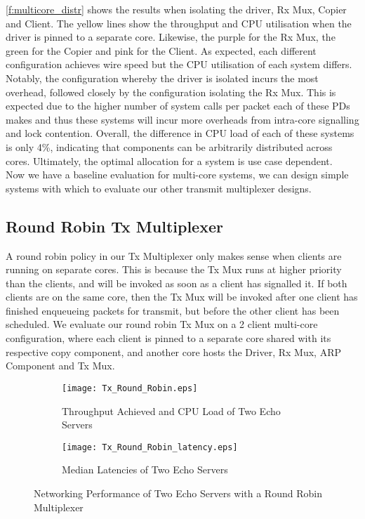 \autoref{f:multicore_distr} shows the results when isolating the driver, Rx Mux, Copier and Client. The yellow lines show the throughput
and CPU utilisation when the driver is pinned to a separate core. Likewise, the purple for the Rx Mux, the green for the Copier and pink for
the Client. As expected, each different configuration achieves wire speed but the CPU utilisation of each system differs. Notably, 
the configuration whereby the driver is isolated incurs the most overhead, followed closely by the configuration isolating the Rx Mux. This is 
expected due to the higher number of system calls per packet each of these PDs makes and thus these systems will incur more overheads from
intra-core signalling and lock contention. Overall, the difference in CPU load of each of these systems is only 4\%, indicating that
components can be arbitrarily distributed across cores. Ultimately, the optimal allocation for a system is use case dependent.\\

Now we have a baseline evaluation for multi-core systems, we can design simple systems with which to evaluate our other transmit multiplexer
designs. 

\subsection{Round Robin Tx Multiplexer}

A round robin policy in our Tx Multiplexer only makes sense when clients are running on separate cores. This is because the Tx Mux runs at higher
priority than the clients, and will be invoked as soon as a client has signalled it. If both clients are on the same core, then the Tx Mux will
be invoked after one client has finished enqueueing packets for transmit, but before the other client has been scheduled. We evaluate our round robin
Tx Mux on a 2 client multi-core configuration, where each client is pinned to a separate core shared with its respective copy component, and another
core hosts the Driver, Rx Mux, ARP Component and Tx Mux. 

\noindent\begin{figure}[h]
    \centering
	\begin{multicols}{2}
		\begin{subfigure}[b]{0.45\textwidth}
        \centering
        \texttt{[image: Tx\_Round\_Robin.eps]}
        \caption{Throughput Achieved and CPU Load of Two Echo Servers}
        \label{f:round_robin_mux}
    \end{subfigure}\qquad
    \begin{subfigure}[b]{0.45\textwidth}
        \vspace{52pt}
        \centering
        \texttt{[image: Tx\_Round\_Robin\_latency.eps]}
        \vspace{0.5pt}
        \caption{Median Latencies of Two Echo Servers}
        \label{f:round_robin_mux_latency}
    \end{subfigure}
\end{multicols}
\caption{Networking Performance of Two Echo Servers with a Round Robin Multiplexer}
\end{figure}

